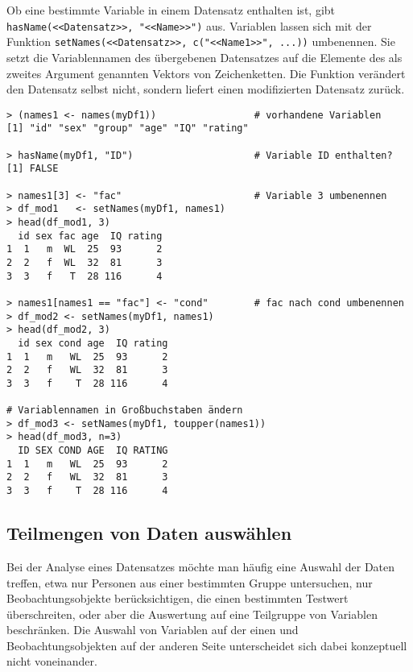 Ob eine bestimmte Variable in einem Datensatz enthalten ist, gibt \lstinline!hasName(<<Datensatz>>, "<<Name>>")! aus. Variablen lassen sich mit der Funktion \lstinline!setNames(<<Datensatz>>, c("<<Name1>>", ...))! umbenennen. Sie setzt die Variablennamen des übergebenen Datensatzes auf die Elemente des als zweites Argument genannten Vektors von Zeichenketten. Die Funktion verändert den Datensatz selbst nicht, sondern liefert einen modifizierten Datensatz zurück.
\begin{lstlisting}
> (names1 <- names(myDf1))                 # vorhandene Variablen
[1] "id" "sex" "group" "age" "IQ" "rating"

> hasName(myDf1, "ID")                     # Variable ID enthalten?
[1] FALSE

> names1[3] <- "fac"                       # Variable 3 umbenennen
> df_mod1   <- setNames(myDf1, names1)
> head(df_mod1, 3)
  id sex fac age  IQ rating
1  1   m  WL  25  93      2
2  2   f  WL  32  81      3
3  3   f   T  28 116      4

> names1[names1 == "fac"] <- "cond"        # fac nach cond umbenennen
> df_mod2 <- setNames(myDf1, names1)
> head(df_mod2, 3)
  id sex cond age  IQ rating
1  1   m   WL  25  93      2
2  2   f   WL  32  81      3
3  3   f    T  28 116      4

# Variablennamen in Großbuchstaben ändern
> df_mod3 <- setNames(myDf1, toupper(names1))
> head(df_mod3, n=3)
  ID SEX COND AGE  IQ RATING
1  1   m   WL  25  93      2
2  2   f   WL  32  81      3
3  3   f    T  28 116      4
\end{lstlisting}
  
\subsection{Teilmengen von Daten auswählen}
\label{sec:subset}

Bei der Analyse eines Datensatzes möchte man häufig eine Auswahl der Daten treffen, etwa nur Personen aus einer bestimmten Gruppe untersuchen, nur Beobachtungsobjekte berücksichtigen, die einen bestimmten Testwert überschreiten, oder aber die Auswertung auf eine Teilgruppe von Variablen beschränken. Die Auswahl von Variablen auf der einen und Beobachtungsobjekten auf der anderen Seite unterscheidet sich dabei konzeptuell nicht voneinander.

